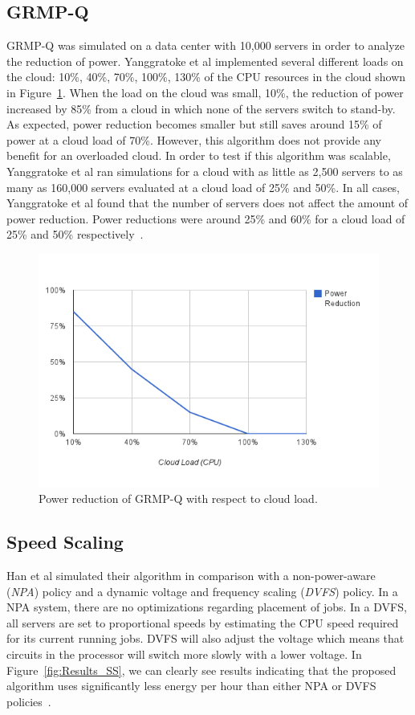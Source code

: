 \documentclass{sig-alternate}
\begin{document}
\subsection{GRMP-Q}
\label{sec:GRMP-Q}

GRMP-Q was simulated on a data center with 10,000 servers in order to analyze the reduction of power. Yanggratoke et al implemented several different loads on the cloud: 10\%, 40\%, 70\%, 100\%, 130\% of the CPU resources in the cloud shown in Figure~\ref{fig:Results_PR}. When the load on the cloud was small, 10\%, the reduction of power increased by 85\% from a cloud in which none of the servers switch to stand-by. As expected, power reduction becomes smaller but still saves around 15\% of power at a cloud load of 70\%.  However, this algorithm does not provide any benefit for an overloaded cloud.  In order to test if this algorithm was scalable, Yanggratoke et al ran simulations for a cloud with as little as 2,500 servers to as many as 160,000 servers evaluated at a cloud load of 25\% and 50\%. In all cases, Yanggratoke et al found that the number of servers does not affect the amount of power reduction. Power reductions were around 25\% and 60\% for a cloud load of 25\% and 50\% respectively~\cite{Yanggratoke}.  


\begin{figure}[tb]
 \includegraphics[height=0.35 \textwidth]{image}
 \caption{Power reduction of GRMP-Q with respect to cloud load. }
 \label{fig:Results_PR}
\end{figure}

\subsection{Speed Scaling}
\label{sec:SS}

Han et al simulated their algorithm in comparison with a non-power-aware (\emph{NPA}) policy and a dynamic voltage and frequency scaling (\emph{DVFS}) policy. In a NPA system, there are no optimizations regarding placement of jobs. In a DVFS, all servers are set to proportional speeds by estimating the CPU speed required for its current running jobs. DVFS will also adjust the voltage which means that circuits in the processor will switch more slowly with a lower voltage. In Figure~\ref{fig:Results_SS},  we can clearly see results indicating that the proposed algorithm uses significantly less energy per hour than either NPA or DVFS policies~\cite{Han}.
\end{document}
